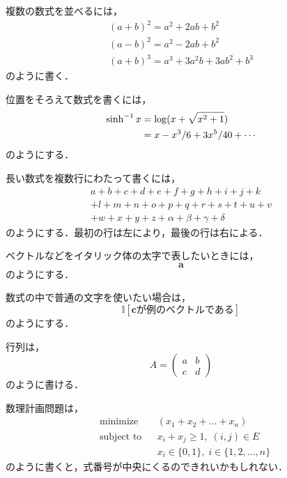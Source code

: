 複数の数式を並べるには，
\begin{gather}
 (a+b)^2 = a^2 + 2ab + b^2 \\
 (a-b)^2 = a^2 - 2ab + b^2 \\
 (a+b)^3 = a^3 + 3a^2b + 3ab^2 + b^3
\end{gather}
のように書く．

位置をそろえて数式を書くには，
\begin{align}
 \sinh^{-1} x &= \log(x + \sqrt{x^2 + 1}) \notag \\
              &= x - x^3 / 6 + 3x^5 / 40 + \dotsb
\end{align}
のようにする．

長い数式を複数行にわたって書くには，
\begin{multline}
 a + b + c + d + e + f + g + h + i + j + k \\
   + l + m + n + o + p + q + r + s + t + u + v \\
   + w + x + y + z + \alpha + \beta + \gamma + \delta
\end{multline}
のようにする．最初の行は左により，最後の行は右による．

ベクトルなどをイタリック体の太字で表したいときには，
\begin{equation}
 \bm{a}
\end{equation}
のようにする．

数式の中で普通の文字を使いたい場合は，
\begin{equation}
 \mathbb{I} \left[
             \text{$\bm{c}$が例のベクトルである}
            \right]
\end{equation}
のようにする．

行列は，
\begin{equation}
 A =
 \begin{pmatrix}
  a & b \\
  c & d
 \end{pmatrix}
\end{equation}
のように書ける．

数理計画問題は，
\begin{equation}
 \begin{aligned}
   & \text{minimize}   & &(x_1 + x_2 + \dots + x_n) \\
   & \text{subject to} & & x_i + x_j \ge 1, \; (i, j) \in E \\
   &                   & & x_i \in \{0, 1\}, \; i \in \{1, 2, \dots, n\}
 \end{aligned}
 \label{eq:IP}
\end{equation}
のように書くと，式番号が中央にくるのできれいかもしれない．

